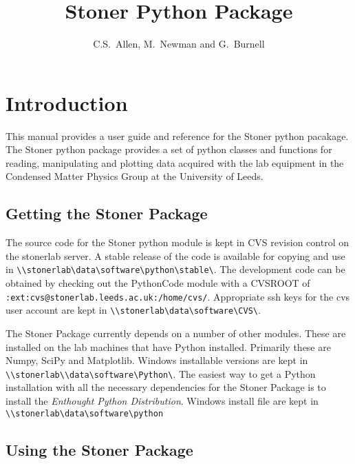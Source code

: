 \documentclass[a4paper,11pt]{scrartcl}
\author{C.S.~Allen, M.~Newman and G.~Burnell}
\title{Stoner Python Package}
\begin{document}
\maketitle

\tableofcontents
\newpage
\pagestyle{scrheadings} 
\ifoot[\today]{\today}



  \section{Introduction}

This manual provides a user guide and reference for the Stoner python pacakage.
The Stoner python package provides a set of python classes and functions for
reading, manipulating and plotting data acquired with the lab equipment in the
Condensed Matter Physics Group at the University of Leeds.

\subsection{Getting the Stoner Package}

The source code for the Stoner python module is kept in CVS revision control on
the stonerlab server. A stable release of the code is available for copying and
use in \verb#\\stonerlab\data\software\python\stable\#. The development code can
be obtained by checking out the PythonCode module with a CVSROOT of \\
\verb#:ext:cvs@stonerlab.leeds.ac.uk:/home/cvs/#. Appropriate ssh keys for the
cvs user account are kept in \verb#\\stonerlab\data\software\CVS\#.

The Stoner Package currently depends on a number of other modules. These are
installed on the lab machines that have Python installed. Primarily these are
Numpy, SciPy and Matplotlib. Windows installable versions are kept in \\
\verb#\\stonerlab\\data\software\Python\#.  The easiest way to get a Python
installation with all the necessary dependencies for the Stoner Package is to
install the \textit{Enthought Python Distribution}. Windows install file are
kept in \verb#\\stonerlab\data\software\python#


\subsection{Using the Stoner Package}
\end{document}
